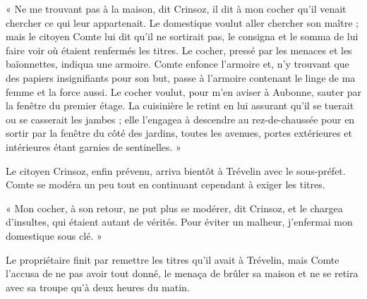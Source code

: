 \documentclass[french,twoside]{book} %
\newenvironment{quoteblock}%
  {\begin{quoting}}
  {\end{quoting}}
\newenvironment{quotebar}{%
    \def\FrameCommand{{\color{rubric!10!}\vrule width 0.5em} \hspace{0.9em}}%
    \def\OuterFrameSep{\itemsep} %
    \MakeFramed {\advance\hsize-\width \FrameRestore}
  }%
  {%
    \endMakeFramed
  }
\renewenvironment{quoteblock}%
  {%
    \savenotes
    \setstretch{0.9}
    \begin{quotebar}
  }
  {%
    \end{quotebar}
    \spewnotes
  }
\begin{document}
\begin{quoteblock}
 \noindent « Ne me trouvant pas à la maison, dit Crinsoz, il dit à mon cocher qu’il venait chercher ce qui leur appartenait. Le domestique voulut aller chercher son maître ; mais le citoyen Comte lui dit qu’il ne sortirait pas, le consigna et le somma de lui faire voir où étaient renfermés les titres. Le cocher, pressé par les menaces et les baïonnettes, indiqua une armoire. Comte enfonce l’armoire et, n’y trouvant que des papiers insignifiants pour son but, passe à l’armoire contenant le linge de ma femme et la force aussi. Le cocher voulut, pour m’en aviser à Aubonne, sauter par la fenêtre du premier étage. La cuisinière le retint en lui assurant qu’il se tuerait ou se casserait les jambes ; elle l’engagea à descendre au rez-de-chaussée pour en sortir par la fenêtre du côté des jardins, toutes les avenues, portes extérieures et intérieures étant garnies de sentinelles. »
 \end{quoteblock}

\noindent Le citoyen Crinsoz, enfin prévenu, arriva bientôt à Trévelin avec le sous-préfet. Comte se modéra un peu tout en continuant cependant à exiger les titres.\par

\begin{quoteblock}
\noindent « Mon cocher, à son retour, ne put plus se modérer, dit Crinsoz, et le chargea d’insultes, qui étaient autant de vérités. Pour éviter un malheur, j’enfermai mon domestique sous clé. »\end{quoteblock}

\noindent Le propriétaire finit par remettre les titres qu’il avait à Trévelin, mais Comte l’accusa de ne pas avoir tout donné, le menaça de brûler sa maison et ne se retira avec sa troupe qu’à deux heures du matin.
\end{document}

